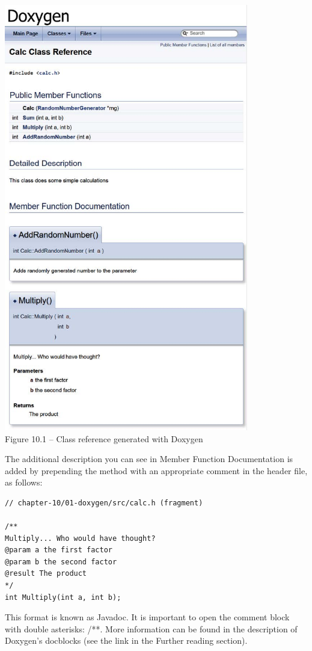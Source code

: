 \begin{center}
\includegraphics[width=0.8\textwidth]{content/3/chapter10/images/1.jpg}\\
Figure 10.1 – Class reference generated with Doxygen
\end{center}

The additional description you can see in Member Function Documentation is added by prepending the method with an appropriate comment in the header file, as follows:

\begin{lstlisting}[style=styleCXX]
// chapter-10/01-doxygen/src/calc.h (fragment)

/**
Multiply... Who would have thought?
@param a the first factor
@param b the second factor
@result The product
*/
int Multiply(int a, int b);
\end{lstlisting}

This format is known as Javadoc. It is important to open the comment block with double asterisks: /**. More information can be found in the description of Doxygen's docblocks (see the link in the Further reading section).

